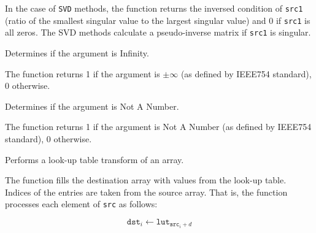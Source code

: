 In the case of \texttt{SVD} methods, the function returns the inversed condition of \texttt{src1} (ratio of the smallest singular value to the largest singular value) and 0 if \texttt{src1} is all zeros. The SVD methods calculate a pseudo-inverse matrix if \texttt{src1} is singular.


Determines if the argument is Infinity.


\begin{description}
\end{description}

The function returns 1 if the argument is $\pm \infty $ (as defined by IEEE754 standard), 0 otherwise.

Determines if the argument is Not A Number.


\begin{description}
\end{description}

The function returns 1 if the argument is Not A Number (as defined by IEEE754 standard), 0 otherwise.


Performs a look-up table transform of an array.


\begin{description}
\end{description}

The function fills the destination array with values from the look-up table. Indices of the entries are taken from the source array. That is, the function processes each element of \texttt{src} as follows:

\[
\texttt{dst}_i \leftarrow \texttt{lut}_{\texttt{src}_i + d}
\]

